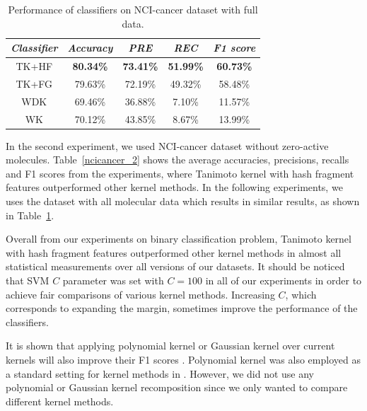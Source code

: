 \documentclass[english]{tktltiki}
\begin{document}
\begin{center}
\begin{table}
\centering
\begin{tabular}{|c||c|c|c|c|}\hline
\textbf{\em Classifier}	&\textbf{\em Accuracy } &\textbf{\em PRE } &\textbf{\em REC } &\textbf{\em F1 score } \\ \hline \hline
TK+HF & \textbf{80.34\%} & \textbf{73.41\%} & \textbf{51.99\%} & \textbf{60.73\%}\\ \hline
TK+FG & 79.63\% & 72.19\% & {49.32\%} & {58.48\%} \\ \hline
WDK & 69.46\% & 36.88\% & 7.10\% & 11.57\% \\ \hline
WK & 70.12\% & 43.85\% & 8.67\% & 13.99\% \\ \hline
\end{tabular}
\caption[Classifier performances on NCI-cancer dataset 3.]{Performance of classifiers on NCI-cancer dataset with full data.}
\label{ncicancer_3}
\end{table}
\end{center}

In the second experiment, we used NCI-cancer dataset without zero-active molecules. Table~\ref{ncicancer_2} shows the average accuracies, precisions, recalls and F1 scores from the experiments, where Tanimoto kernel with hash fragment features outperformed other kernel methods. In the following experiments, we uses the dataset with all molecular data which results in similar results, as shown in Table~\ref{ncicancer_3}.



Overall from our experiments on binary classification problem, Tanimoto kernel with hash fragment features outperformed other kernel methods in almost all statistical measurements over all versions of our datasets. It should be noticed that SVM $C$ parameter was set with $C=100$ in all of our experiments in order to achieve fair comparisons of various kernel methods. Increasing $C$, which corresponds to expanding the margin, sometimes improve the performance of the classifiers. 

It is shown that applying polynomial kernel or Gaussian kernel over current kernels will also improve their F1 scores \cite{astikainen08}. Polynomial kernel was also employed as a standard setting for kernel methods in \cite{menchetti05, ceroni07}. However, we did not use any polynomial or Gaussian kernel recomposition since we only wanted to compare different kernel methods.
\end{document}
